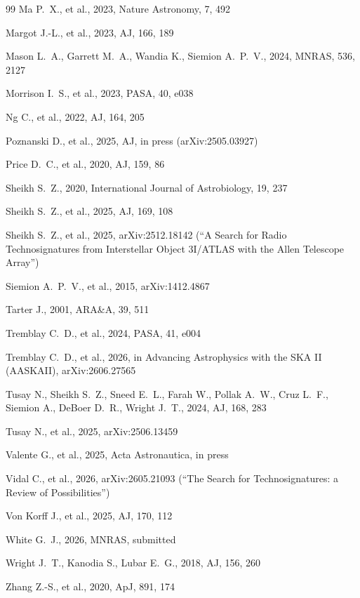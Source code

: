 \documentclass{openjournal}
\begin{document}
\begin{thebibliography}{99}
 Ma P.~X., et al., 2023, Nature Astronomy, 7, 492

 Margot J.-L., et al., 2023, AJ, 166, 189

 Mason L.~A., Garrett M.~A., Wandia K., Siemion A.~P.~V., 2024, MNRAS, 536, 2127

 Morrison I.~S., et al., 2023, PASA, 40, e038

 Ng C., et al., 2022, AJ, 164, 205

 Poznanski D., et al., 2025, AJ, in press (arXiv:2505.03927)

 Price D.~C., et al., 2020, AJ, 159, 86

 Sheikh S.~Z., 2020, International Journal of Astrobiology, 19, 237

 Sheikh S.~Z., et al., 2025, AJ, 169, 108

 Sheikh S.~Z., et al., 2025, arXiv:2512.18142 (``A Search for Radio Technosignatures from Interstellar Object 3I/ATLAS with the Allen Telescope Array'')

 Siemion A.~P.~V., et al., 2015, arXiv:1412.4867

 Tarter J., 2001, ARA\&A, 39, 511

 Tremblay C.~D., et al., 2024, PASA, 41, e004

 Tremblay C.~D., et al., 2026, in Advancing Astrophysics with the SKA II (AASKAII), arXiv:2606.27565

 Tusay N., Sheikh S.~Z., Sneed E.~L., Farah W., Pollak A.~W., Cruz L.~F., Siemion A., DeBoer D.~R., Wright J.~T., 2024, AJ, 168, 283

 Tusay N., et al., 2025, arXiv:2506.13459

 Valente G., et al., 2025, Acta Astronautica, in press

 Vidal C., et al., 2026, arXiv:2605.21093 (``The Search for Technosignatures: a Review of Possibilities'')

 Von Korff J., et al., 2025, AJ, 170, 112

 White G.~J., 2026, MNRAS, submitted

 Wright J.~T., Kanodia S., Lubar E.~G., 2018, AJ, 156, 260

 Zhang Z.-S., et al., 2020, ApJ, 891, 174

\end{thebibliography}
\end{document}
